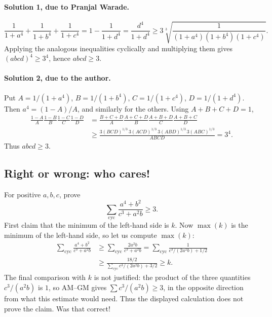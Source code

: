 \documentclass[11pt,a4paper]{article}
\begin{document}
\paragraph{Solution 1, due to Pranjal Warade.}
\[
\frac1{1+a^4}+\frac1{1+b^4}+\frac1{1+c^4}
=1-\frac1{1+d^4}=\frac{d^4}{1+d^4}
\geq3\sqrt[3]{\frac1{(1+a^4)(1+b^4)(1+c^4)}}.
\]
Applying the analogous inequalities cyclically and multiplying them gives $(abcd)^4\geq3^4$, hence $abcd\geq3$.
\paragraph{Solution 2, due to the author.}
Put $A=1/(1+a^4)$, $B=1/(1+b^4)$, $C=1/(1+c^4)$, $D=1/(1+d^4)$.
Then $a^4=(1-A)/A$, and similarly for the others.
Using $A+B+C+D=1$,
\begin{align*}
\frac{1-A}{A}\frac{1-B}{B}\frac{1-C}{C}\frac{1-D}{D}
&=\frac{B+C+D}{A}\frac{A+C+D}{B}\frac{A+B+D}{C}\frac{A+B+C}{D}\\
&\geq\frac{3(BCD)^{1/3}\,3(ACD)^{1/3}\,3(ABD)^{1/3}\,3(ABC)^{1/3}}{ABCD}
=3^4.
\end{align*}
Thus $abcd\geq3$.

\subsection{Right or wrong: who cares!}
For positive $a,b,c$, prove
\[
\sum_{\mathrm{cyc}}\frac{a^4+b^2}{c^3+a^2b}\geq3.
\]
First claim that the minimum of the left-hand side is $k$.
Now $\max(k)$ is the minimum of the left-hand side, so let us compute $\max(k)$:
\begin{align*}
\sum_{\mathrm{cyc}}\frac{a^4+b^2}{c^3+a^2b}
&\geq\sum_{\mathrm{cyc}}\frac{2a^2b}{c^3+a^2b}
=\sum_{\mathrm{cyc}}\frac1{c^3/(2a^2b)+1/2}\\
&\geq\frac{18/2}{\sum_{\mathrm{cyc}}c^3/(2a^2b)+3/2}\geq k.
\end{align*}
The final comparison with $k$ is not justified: the product of the three
quantities $c^3/(a^2b)$ is $1$, so AM--GM gives
$\sum c^3/(a^2b)\geq3$, in the opposite direction from what this estimate
would need. Thus the displayed calculation does not prove the claim.
Was that correct!

\end{document}
